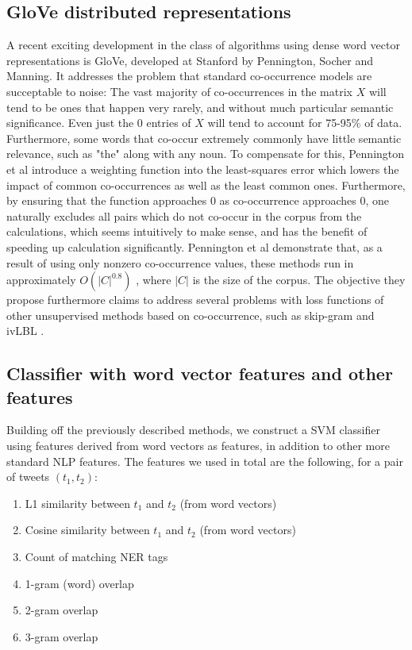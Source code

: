 \documentclass[conference]{IEEEtran}
\begin{document}
\subsection{GloVe distributed representations}
A recent exciting development in the class of algorithms using dense word vector representations is GloVe, developed at Stanford by Pennington, Socher and Manning. It addresses the problem that standard co-occurrence models are succeptable to noise: The vast majority of co-occurrences in the matrix $X$ will tend to be ones that happen very rarely, and without much particular semantic significance. Even just the 0 entries of $X$ will tend to account for 75-95\% of data. Furthermore, some words that co-occur extremely commonly have little semantic relevance, such as "the" along with any noun. To compensate for this, Pennington et al introduce a weighting function into the least-squares error which lowers the impact of common co-occurrences as well as the least common ones. Furthermore, by ensuring that the function approaches 0 as co-occurrence approaches 0, one naturally excludes all pairs which do not co-occur in the corpus from the calculations, which seems intuitively to make sense, and has the benefit of speeding up calculation significantly. Pennington et al demonstrate that, as a result of using only nonzero co-occurrence values, these methods run in approximately $O(|C|^{0.8})$ , where $|C|$ is the size of the corpus. The objective they propose furthermore claims to address several problems with loss functions of other unsupervised methods based on co-occurrence, such as skip-gram and ivLBL \cite{GloVe}. \\

\subsection{Classifier with word vector features and other features}
Building off the previously described methods, we construct a SVM classifier using features derived from word vectors as features, in addition to other more standard NLP features.  The features we used in total are the following, for a pair of tweets $(t_1, t_2)$:

\begin{enumerate}
\item L1 similarity between $t_1$ and $t_2$ (from word vectors)
\item Cosine similarity between $t_1$ and $t_2$ (from word vectors)
\item Count of matching NER tags
\item 1-gram (word) overlap
\item 2-gram overlap
\item 3-gram overlap
\end{enumerate}
\end{document}
